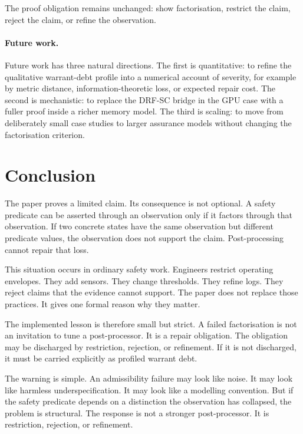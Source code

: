 \documentclass[a4paper,11pt]{article}
\begin{document}
The proof obligation remains unchanged: show factorisation, restrict the
claim, reject the claim, or refine the observation.

\paragraph{Future work.}
Future work has three natural directions. The first is quantitative: to refine
the qualitative warrant-debt profile into a numerical account of severity, for
example by metric distance, information-theoretic loss, or expected repair cost.
The second is mechanistic: to replace the DRF-SC bridge in the GPU case with a
fuller proof inside a richer memory model. The third is scaling: to move from
deliberately small case studies to larger assurance models without changing the
factorisation criterion.

\section{Conclusion}
\label{sec:conclusion}

The paper proves a limited claim. Its consequence is not optional. A safety
predicate can be asserted through an observation only if it factors through
that observation. If two concrete states have the same observation but different
predicate values, the observation does not support the claim. Post-processing
cannot repair that loss.

This situation occurs in ordinary safety work. Engineers restrict operating
envelopes. They add sensors. They change thresholds. They refine logs. They
reject claims that the evidence cannot support. The paper does not replace
those practices. It gives one formal reason why they matter.

The implemented lesson is therefore small but strict.  A failed
factorisation is not an invitation to tune a post-processor.  It is a repair
obligation.  The obligation may be discharged by restriction, rejection, or
refinement.  If it is not discharged, it must be carried explicitly as profiled
warrant debt.

The warning is simple. An admissibility failure may look like noise. It may look
like harmless underspecification. It may look like a modelling convention. But
if the safety predicate depends on a distinction the observation has collapsed,
the problem is structural. The response is not a stronger post-processor. It
is restriction, rejection, or refinement.
\end{document}
